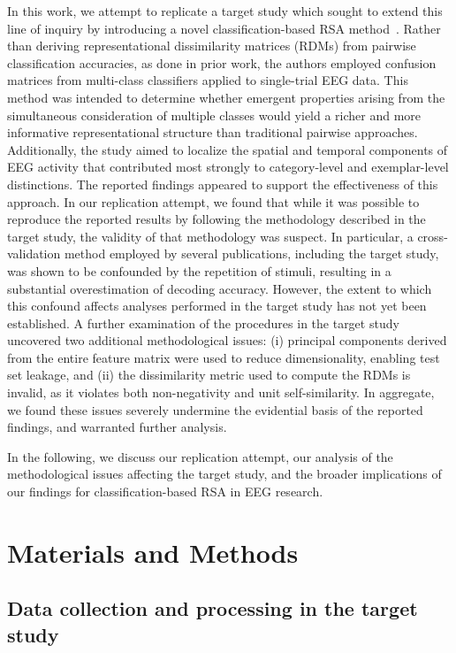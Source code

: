 In this work, we attempt to replicate a target study which sought to extend this line of inquiry by introducing a novel classification-based RSA method~\cite{Kaneshiro:2015}. Rather than deriving representational dissimilarity matrices (RDMs) from pairwise classification accuracies, as done in prior work, the authors employed confusion matrices from multi-class classifiers applied to single-trial EEG data. This method was intended to determine whether emergent properties arising from the simultaneous consideration of multiple classes would yield a richer and more informative representational structure than traditional pairwise approaches. Additionally, the study aimed to localize the spatial and temporal components of EEG activity that contributed most strongly to category-level and exemplar-level distinctions. The reported findings appeared to support the effectiveness of this approach. In our replication attempt, we found that while it was possible to reproduce the reported results by following the methodology described in the target study, the validity of that methodology was suspect. In particular, a cross-validation method employed by several publications, including the target study, was shown to be confounded by the repetition of stimuli, resulting in a substantial overestimation of decoding accuracy. However, the extent to which this confound affects analyses performed in the target study has not yet been established. A further examination of the procedures in the target study uncovered two additional methodological issues: (i) principal components derived from the entire feature matrix were used to reduce dimensionality, enabling test set leakage, and (ii) the dissimilarity metric used to compute the RDMs is invalid, as it violates both non-negativity and unit self-similarity. In aggregate, we found these issues severely undermine the evidential basis of the reported findings, and warranted further analysis.

In the following, we discuss our replication attempt, our analysis of the methodological issues affecting the target study, and the broader implications of our findings for classification-based RSA in EEG research.

\section{Materials and Methods}
\subsection{Data collection and processing in the target study}

